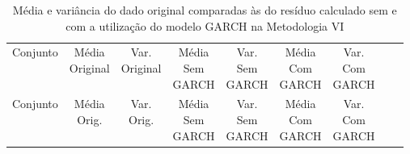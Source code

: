 \clearpage

\begin{center}
\begin{longtable}{ccccccccc}
\toprule
\rowcolor{white}
\caption[Metodologia VI: dados estatísticos]{Média e variância do dado original
comparadas às do resíduo calculado sem e com a utilização do modelo GARCH na
Metodologia VI} \label{tab:DadosEstatisticosMet6}\\
\midrule
    Conjunto & \specialcell{Média\\Original} &
    \specialcell{Var.\\Original} & \specialcell{Média\\Sem\\GARCH} &
    \specialcell{Var.\\Sem\\GARCH} & \specialcell{Média\\Com\\GARCH}&
    \specialcell{Var.\\Com\\GARCH} \\

\midrule
\endfirsthead 
\midrule
\rowcolor{white}
    Conjunto & \specialcell{Média\\Orig.} &
    \specialcell{Var.\\Orig.} & \specialcell{Média\\Sem\\GARCH} &
    \specialcell{Var.\\Sem\\GARCH} & \specialcell{Média\\Com\\GARCH}&
    \specialcell{Var.\\Com\\GARCH} \\


\end{longtable}
\end{center}
